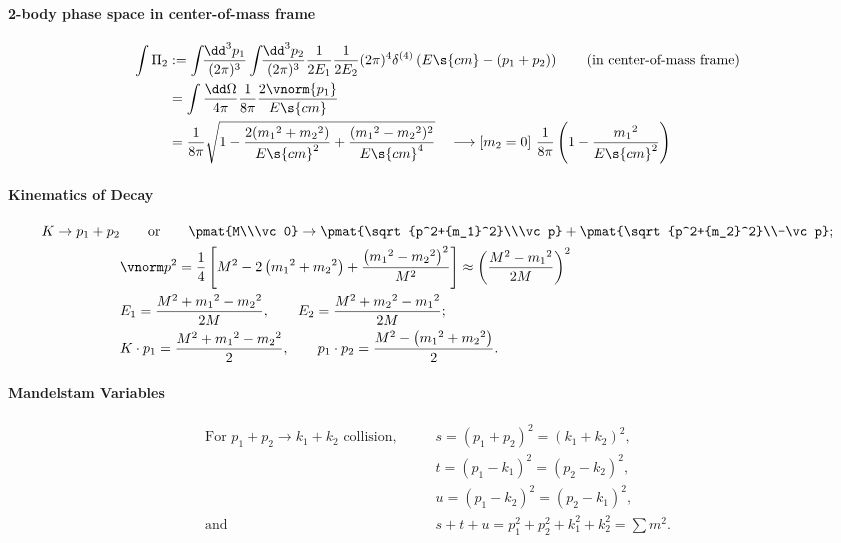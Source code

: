 \paragraph{2-body phase space in center-of-mass frame}
\begin{align}
 \int\Pi_2&:=
\intdP{p_1}\intdP{p_2}\frac{1}{2E_1}\frac{1}{2E_2}
(2\pi)^4\delta^{(4)}\left(E\s{cm}-(p_1+p_2)\right)\qquad\text{(in
 center-of-mass frame)}\\
&= \int\frac{\dd\Omega}{4\pi}\frac1{8\pi}\frac{2\vnorm{p_1}}{E\s{cm}}\\
&= \frac{1}{8\pi}
   \sqrt{1-\frac{2({m_1}^2+{m_2}^2)}{E\s{cm}^2}+\frac{({m_1}^2-{m_2}^2)^2}{E\s{cm}^4}}
\quad \longrightarrow [m_2=0]\ \frac{1}{8\pi}\left(1-\frac{{m_1}^2}{{E\s{cm}}^2}\right)
\end{align}
\paragraph{Kinematics of Decay}
\begin{align}
 K\to p_1 + p_2 &\qquad\text{or}\qquad
 \pmat{M\\\vc 0}\to\pmat{\sqrt{p^2+{m_1}^2}\\\vc p}+\pmat{\sqrt{p^2+{m_2}^2}\\-\vc p};\\
 & \vnorm p^2=\frac14\left[M^2-2\left({m_1}^2+{m_2}^2\right)+\frac{\left({m_1}^2-{m_2}^2\right)^2}{M^2}\right]
 \approx \left(\frac{M^2-{m_1}^2}{2M}\right)^2\notag\\
 &E_1=\frac{M^2+{m_1}^2-{m_2}^2}{2M},\qquad
  E_2=\frac{M^2+{m_2}^2-{m_1}^2}{2M};\notag\\
 &K\cdot p_1  = \frac{M^2+{m_1}^2-{m_2}^2}{2},\qquad
  p_1\cdot p_2= \frac{M^2-\left({m_1}^2+{m_2}^2\right)}2.\notag
\end{align}

\paragraph{Mandelstam Variables}
\begin{align*}
\text{For $p_1 + p_2 \to k_1 + k_2$ collision,}\qquad
&s=(p_1+p_2)^2=(k_1+k_2)^2,\\
&t=(p_1-k_1)^2=(p_2-k_2)^2,\\
&u=(p_1-k_2)^2=(p_2-k_1)^2,\\
\text{and}\qquad&s+t+u=p_1^2+p_2^2+k_1^2+k_2^2=\sum m^2.
\end{align*}

